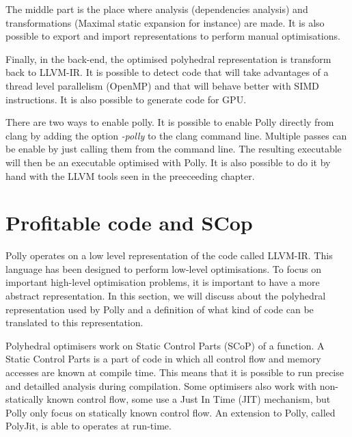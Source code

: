 The middle part is the place where analysis (dependencies analysis) and transformations (Maximal static expansion for instance) are made. It is also possible to export and import representations to perform manual optimisations.

Finally, in the back-end, the optimised polyhedral representation is transform back to LLVM-IR. It is possible to detect code that will take advantages of a thread level parallelism (OpenMP) and that will behave better with SIMD instructions. It is also possible to generate code for GPU. 

There are two ways to enable polly. It is possible to enable Polly directly from clang by adding the option \emph{-polly} to the clang command line. Multiple passes can be enable by just calling them from the command line. The resulting executable will then be an executable optimised with Polly. It is also possible to do it by hand with the LLVM tools seen in the preeceeding chapter.

\section{Profitable code and SCop}
Polly operates on a low level representation of the code called LLVM-IR. This language has been designed to perform low-level optimisations. To focus on important high-level optimisation problems, it is important to have a more abstract representation. In this section, we will discuss about the polyhedral representation used by Polly and a definition of what kind of code can be translated to this representation.

Polyhedral optimisers work on Static Control Parts (SCoP) of a function. A Static Control Parts is a part of code in which all control flow and memory accesses are known at compile time. This means that it is possible to run precise and detailled analysis during compilation. Some optimisers also work with non-statically known control flow, some use a Just In Time (JIT) mechanism, but Polly only focus on statically known control flow. An extension to Polly, called PolyJit\cite{PolyJit}, is able to operates at run-time.

